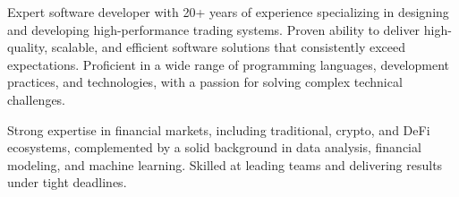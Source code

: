 

\begin{cvparagraph}

Expert software developer with 20+ years of experience specializing in designing and developing high-performance trading systems. Proven ability to deliver high-quality, scalable, and efficient software solutions that consistently exceed expectations. Proficient in a wide range of programming languages, development practices, and technologies, with a passion for solving complex technical challenges.

Strong expertise in financial markets, including traditional, crypto, and DeFi ecosystems, complemented by a solid background in data analysis, financial modeling, and machine learning. Skilled at leading teams and delivering results under tight deadlines.
\end{cvparagraph}
